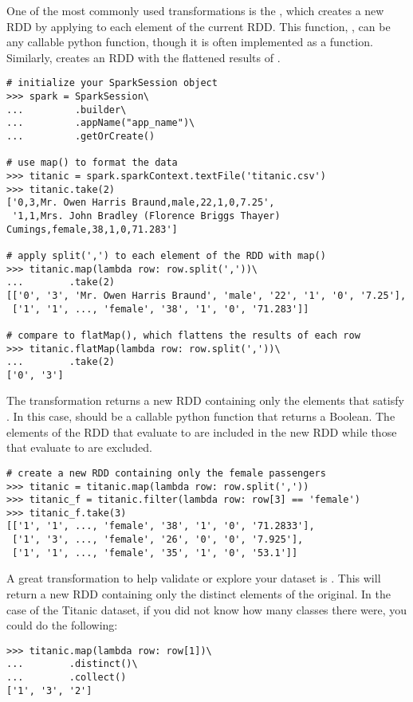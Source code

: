 One of the most commonly used transformations is the , which creates a new RDD by applying  to each element of the current RDD. This function, , can be any callable python function, though it is often implemented as a  function.
Similarly,  creates an RDD with the flattened results of .

\begin{lstlisting}
# initialize your SparkSession object
>>> spark = SparkSession\
...         .builder\
...         .appName("app_name")\
...         .getOrCreate()

# use map() to format the data
>>> titanic = spark.sparkContext.textFile('titanic.csv')
>>> titanic.take(2)
['0,3,Mr. Owen Harris Braund,male,22,1,0,7.25',
 '1,1,Mrs. John Bradley (Florence Briggs Thayer) Cumings,female,38,1,0,71.283']

# apply split(',') to each element of the RDD with map()
>>> titanic.map(lambda row: row.split(','))\
...		   .take(2)
[['0', '3', 'Mr. Owen Harris Braund', 'male', '22', '1', '0', '7.25'],
 ['1', '1', ..., 'female', '38', '1', '0', '71.283']]

# compare to flatMap(), which flattens the results of each row
>>> titanic.flatMap(lambda row: row.split(','))\
...		   .take(2)
['0', '3']
\end{lstlisting}

The \li{filter(func)} transformation returns a new RDD containing only the elements that satisfy . In this case,  should be a callable python function that returns a Boolean. 
The elements of the RDD that evaluate to  are included in the new RDD while those that evaluate to  are excluded.

\begin{lstlisting}
# create a new RDD containing only the female passengers
>>> titanic = titanic.map(lambda row: row.split(','))
>>> titanic_f = titanic.filter(lambda row: row[3] == 'female')
>>> titanic_f.take(3)
[['1', '1', ..., 'female', '38', '1', '0', '71.2833'],
 ['1', '3', ..., 'female', '26', '0', '0', '7.925'],
 ['1', '1', ..., 'female', '35', '1', '0', '53.1']]
\end{lstlisting}

\begin{info}
A great transformation to help validate or explore your dataset is . This will return a new RDD containing only the distinct elements of the original. In the case of the Titanic dataset, if you did not know how many classes there were, you could do the following:
\begin{lstlisting}
>>> titanic.map(lambda row: row[1])\
...		   .distinct()\
...		   .collect()
['1', '3', '2']
\end{lstlisting}
\end{info}


